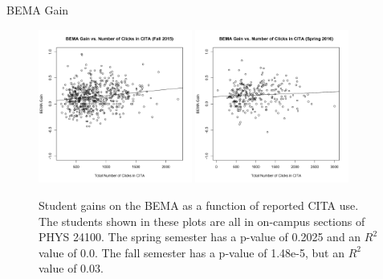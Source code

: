 \documentclass[xcolor=x11names,compress]{beamer}
\begin{document}
\begin{frame}{BEMA Gain}
	\begin{figure}[ht]
		\centering
		\includegraphics[width=0.45\textwidth]{img/bema_fa15_gain.pdf}
		\includegraphics[width=0.45\textwidth]{img/bema_sp16_gain.pdf}
		\caption{Student gains on the BEMA as a function of reported CITA use. The students shown in these plots are all in on-campus sections of PHYS 24100. The spring semester has a p-value of 0.2025 and an $R^2$ value of 0.0. The fall semester has a p-value of 1.48e-5, but an $R^2$ value of 0.03.}
	\end{figure}
\end{frame}
\end{document}
